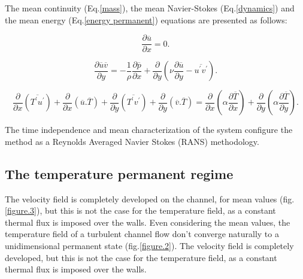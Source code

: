 \documentclass[10pt]{article} %
\begin{document}
The mean continuity (Eq.\ref{mass}), the mean Navier-Stokes (Eq.\ref{dynamics}) and the mean energy (Eq.\ref{energy permanent}) equations are presented as follows: 


\begin{equation}\label{mass}
\frac{\partial \overline{u}}{\partial x} = 0.
\end{equation}

\begin{equation}\label{dynamics}
\frac{\partial \overline{u}\overline{v}}{\partial y} = 
- \frac{1}{\rho} \frac{\partial \overline{p}}{\partial x} + \frac{\partial}{\partial y}\left(\nu \frac{\partial \overline{u}}{\partial y} - \overline{u^\prime v^\prime}\right).
\end{equation}


\begin{equation}\label{energy permanent}
\frac{\partial{}}{\partial{x}} \left(\overline{T^\prime u^\prime}\right) + \frac{\partial{}}{\partial{x}}\left(\overline{u}.\overline{T}\right)     + 
\frac{\partial{}}{\partial{y}} \left(\overline{T^\prime v^\prime}\right) + \frac{\partial{}}{\partial{y}}\left(\overline{v}.\overline{T}\right) 
=
{\frac{\partial{}}{\partial{x}}} \left(\alpha {\frac{\partial{\overline{T}}}{\partial{x}}} \right) +
{\frac{\partial{}}{\partial{y}}} \left(\alpha {\frac{\partial{\overline{T}}}{\partial{y}}} \right). 
\end{equation}


The time independence and mean characterization of the system configure the method as a Reynolds Averaged Navier Stokes (RANS) methodology.

\subsection{The temperature permanent regime}

The velocity field is completely developed on the channel, for mean values (fig.\ref{figure.3}), but this is not the case for the temperature field, as a constant thermal flux is imposed over the walls.
Even considering the mean values, the temperature field of a turbulent channel flow don't converge naturally to a unidimensional permanent state (fig.\ref{figure.2}). The velocity field is completely developed, but this is not the case for the temperature field, as a constant thermal flux is imposed over the walls.
\end{document}
